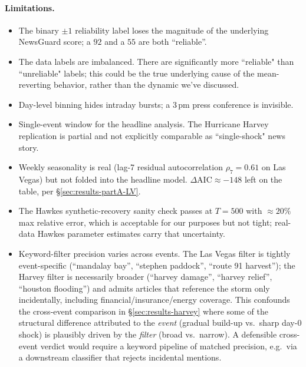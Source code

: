 \documentclass[11pt]{article}
\begin{document}
\paragraph{Limitations.}
\begin{itemize}
  \item The binary $\pm 1$ reliability label loses the magnitude of the
        underlying NewsGuard score; a $92$ and a $55$ are both ``reliable''.
  \item The data labels are imbalanced. There are significantly more ``reliable" than 
        ``unreliable" labels; this could be the true underlying cause of the mean-reverting
        behavior, rather than the dynamic we've discussed.
  \item Day-level binning hides intraday bursts; a 3\,pm press conference is
        invisible.
  \item Single-event window for the headline analysis. The Hurricane Harvey
        replication is partial and not explicitly comparable as ``single-shock" news story. 
  \item Weekly seasonality is real (lag-7 residual autocorrelation
        $\rho_7=0.61$ on Las Vegas) but not folded into the headline model.
        $\Delta\mathrm{AIC}\approx -148$ left on the table, per
        \S\ref{sec:results-partA-LV}.
  \item The Hawkes synthetic-recovery sanity check passes at $T=500$ with
        $\approx\!20\%$ max relative error, which is acceptable for our
        purposes but not tight; real-data Hawkes parameter estimates carry
        that uncertainty.
  \item Keyword-filter precision varies across events. The Las Vegas
        filter is tightly event-specific (``mandalay bay'', ``stephen
        paddock'', ``route 91 harvest''); the Harvey filter is necessarily
        broader (``harvey damage'', ``harvey relief'', ``houston
        flooding'') and admits articles that reference the storm only
        incidentally, including financial/insurance/energy coverage. This
        confounds the cross-event comparison in \S\ref{sec:results-harvey}
        where some of the structural difference attributed to the
        \emph{event} (gradual build-up vs.\ sharp day-0 shock) is
        plausibly driven by the \emph{filter} (broad vs.\ narrow). A
        defensible cross-event verdict would require a keyword pipeline
        of matched precision, e.g.\ via a downstream classifier that
        rejects incidental mentions.
\end{itemize}
\end{document}
